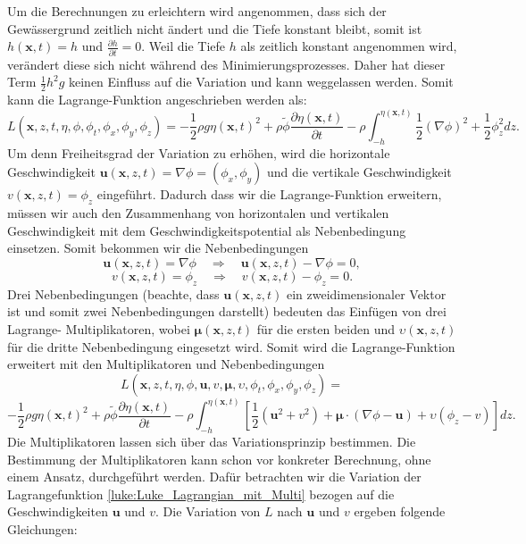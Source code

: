Um die Berechnungen zu erleichtern wird angenommen, dass sich der Gewässergrund zeitlich nicht ändert und die Tiefe konstant bleibt, somit ist $h(\bm{x},t) = h$ und $\frac{\partial h}{\partial t} = 0$.
Weil die Tiefe $h$ als zeitlich konstant angenommen wird, verändert diese sich nicht während des Minimierungsprozesses.
Daher hat dieser Term $\frac{1}{2}h^2g$ keinen Einfluss auf die Variation und kann weggelassen werden.
Somit kann die Lagrange-Funktion angeschrieben werden als:
\[
L(\bm{x},z,t,\eta,\phi,\phi_t,\phi_x, \phi_y, \phi_z)
= 
-\frac{1}{2}\rho g\eta(\bm{x},t)^2 +\rho \tilde{\phi} \frac{\partial\eta(\bm{x},t)}{\partial t} -\rho \int_{-h}^{\eta(\bm{x},t)} \frac{1}{2}\left(\nabla\phi\right)^2 + \frac{1}{2}\phi_z^2 dz
.\]
Um denn Freiheitsgrad der Variation zu erhöhen, wird die horizontale Geschwindigkeit $\bm{u}(\bm{x},z,t) = \nabla\phi = (\phi_x, \phi_y)$ und die vertikale Geschwindigkeit $v(\bm{x},z,t) = \phi_z$ eingeführt. 
Dadurch dass wir die Lagrange-Funktion erweitern, müssen wir auch den Zusammenhang von horizontalen und vertikalen Geschwindigkeit mit dem Geschwindigkeitspotential als Nebenbedingung einsetzen.
Somit bekommen wir die Nebenbedingungen
\[
\bm{u}(\bm{x},z,t)
=
\nabla\phi
\quad\Rightarrow\quad
\bm{u}(\bm{x},z,t)
-
\nabla\phi
=
0,
\]
\[
v(\bm{x},z,t)
=
\phi_z
\quad\Rightarrow\quad
v(\bm{x},z,t)
-
\phi_z
=
0.
\]
Drei Nebenbedingungen (beachte, dass $\bm{u}(\bm{x},z,t)$ ein zweidimensionaler Vektor ist und somit zwei Nebenbedingungen darstellt) bedeuten das Einfügen von drei Lagrange- Multiplikatoren, wobei $\bm{\mu}(\bm{x},z,t)$ für die ersten beiden und $\upsilon(\bm{x},z,t)$ für die dritte Nebenbedingung eingesetzt wird.
Somit wird die Lagrange-Funktion erweitert mit den Multiplikatoren und Nebenbedingungen
\[
L(\bm{x},z,t,\eta,\phi,\bm{u}, v, \bm{\mu},\upsilon,\phi_t,\phi_x,\phi_y,\phi_z)
=
\]
\begin{equation}
	-
	\frac{1}{2}\rho  g \eta(\bm{x},t)^2
	+
	\rho \tilde{\phi} \frac{\partial\eta(\bm{x},t)}{\partial t}
	-
	\rho \int_{-h}^{\eta(\bm{x},t)} \left[ \frac{1}{2} (\bm{u}^2 + v^2) + \bm{\mu} \cdot (\nabla\phi - \bm{u}) + \upsilon  \left(\phi_z - v\right) \right] dz.
	\label{luke:Luke_Lagrangian_mit_Multi}
\end{equation}
Die Multiplikatoren lassen sich über das Variationsprinzip bestimmen.
Die Bestimmung der Multiplikatoren kann schon vor konkreter Berechnung, ohne einem Ansatz, durchgeführt werden.
Dafür betrachten wir die Variation der Lagrangefunktion \eqref{luke:Luke_Lagrangian_mit_Multi} bezogen auf die Geschwindigkeiten $\bm{u}$ und $v$.
Die Variation von $L$ nach $\bm{u}$ und $v$ ergeben folgende Gleichungen:

